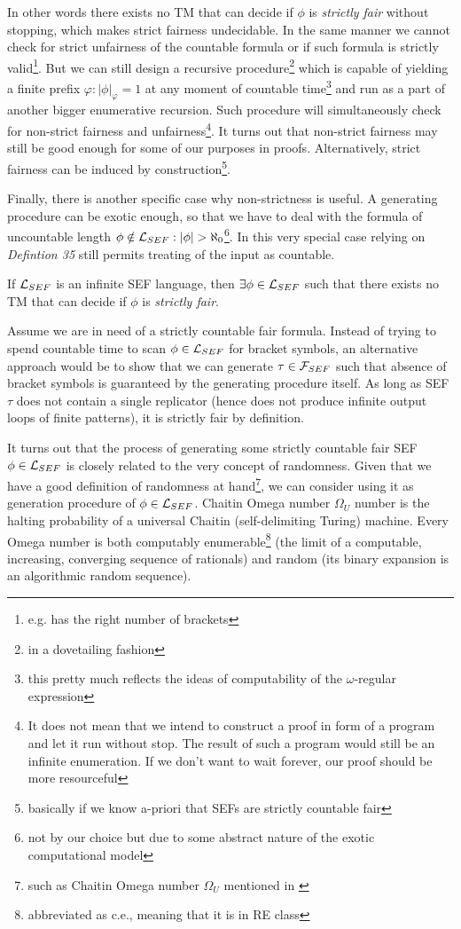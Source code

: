 In other words there exists no TM that can decide if $\phi$ is \textit{strictly fair} without stopping, which makes strict fairness undecidable. In the same manner we cannot check for strict unfairness of the countable formula or if such formula is strictly valid\footnote{e.g. has the right number of brackets}. But we can still design a recursive procedure\footnote{in a dovetailing fashion\cite{stackoverflow:5107312}} which is capable of yielding a finite prefix $\varphi: |\phi|_\varphi = 1$ at any moment of countable time\footnote{this pretty much reflects the ideas of computability of the $\omega$-regular expression} and run as a part of another bigger enumerative recursion. Such procedure will simultaneously check for non-strict fairness and unfairness\footnote{It does not mean that we intend to construct a proof in form of a program and let it run without stop. The result of such a program would still be an infinite enumeration. If we don't want to wait forever, our proof should be more resourceful}. It turns out that non-strict fairness may still be good enough for some of our purposes in proofs. Alternatively, strict fairness can be induced by construction\footnote{basically if we know a-priori that SEFs are strictly countable fair}.

Finally, there is another specific case why non-strictness is useful. A generating procedure can be exotic enough, so that we have to deal with the formula of uncountable length $\phi \notin \mathcal{L}_{SEF} : |\phi| > \aleph_0$\footnote{not by our choice but due to some abstract nature of the exotic computational model}. In this very special case relying on \textit{Defintion 35} still permits treating of the input as countable.

\begin{lemma}
  If $\mathcal{L}_{SEF}$ is an infinite SEF language, then $\exists \phi \in \mathcal{L}_{SEF}$ such that there exists no TM that can decide if $\phi$ is \textit{strictly fair}.
\end{lemma}

Assume we are in need of a strictly countable fair formula. Instead of trying to spend countable time to scan $\phi \in \mathcal{L}_{SEF}$ for bracket symbols, an alternative approach would be to show that we can generate $\tau \in \mathcal{F}_{SEF}$ such that absence of bracket symbols is guaranteed by the generating procedure itself. As long as SEF $\tau$ does not contain a single replicator (hence does not produce infinite output loops of finite patterns), it is strictly fair by definition.

It turns out that the process of generating some strictly countable fair SEF $\phi \in \mathcal{L}_{SEF}$ is closely related to the very concept of randomness. Given that we have a good definition of randomness at hand\footnote{such as Chaitin Omega number $\Omega_U$ mentioned in \cite{Calude2002ComputingAG}}, we can consider using it as generation procedure of $\phi \in \mathcal{L}_{SEF}$. Chaitin Omega number $\Omega_U$ number is the halting probability of a universal Chaitin (self-delimiting Turing) machine. Every Omega number is both computably enumerable\footnote{abbreviated as c.e., meaning that it is in RE class}
(the limit of a computable, increasing, converging sequence of rationals) and random (its binary expansion is an algorithmic random sequence).

